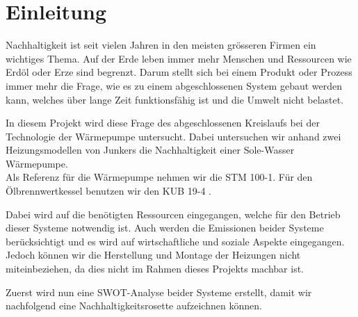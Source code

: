 \chapter{Einleitung}
\label{chap:einleitung}

Nachhaltigkeit ist seit vielen Jahren in den meisten grösseren Firmen ein wichtiges Thema. Auf der Erde leben immer mehr Menschen und Ressourcen wie Erdöl oder Erze sind begrenzt. Darum stellt sich bei einem Produkt oder Prozess immer mehr die Frage, wie es zu einem abgeschlossenen System gebaut werden kann, welches über lange Zeit funktionsfähig ist und die Umwelt nicht belastet.

In diesem Projekt wird diese Frage des abgeschlossenen Kreislaufs bei der Technologie der Wärmepumpe untersucht. Dabei untersuchen wir anhand zwei Heizungsmodellen von Junkers\cite{junkers:home} die Nachhaltigkeit einer Sole-Wasser Wärmepumpe. \\
Als Referenz für die Wärmepumpe nehmen wir die STM 100-1\cite{junkers:stm-100-1}. Für den Ölbrennwertkessel benutzen wir den KUB 19-4 \cite{junkers:kub-19-4}.

Dabei wird auf die benötigten Ressourcen eingegangen, welche für den Betrieb dieser Systeme notwendig ist. Auch werden die Emissionen beider Systeme berücksichtigt und es wird auf wirtschaftliche und soziale Aspekte eingegangen.
Jedoch können wir die Herstellung und Montage der Heizungen nicht miteinbeziehen, da dies nicht im Rahmen dieses Projekts machbar ist.

Zuerst wird nun eine SWOT-Analyse beider Systeme erstellt, damit wir nachfolgend eine Nachhaltigkeitsrosette aufzeichnen können.






